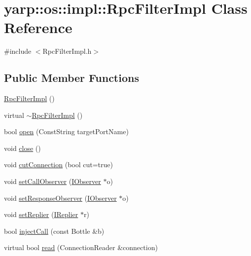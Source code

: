 \hypertarget{classyarp_1_1os_1_1impl_1_1_rpc_filter_impl}{
\section{yarp::os::impl::RpcFilterImpl Class Reference}
\label{classyarp_1_1os_1_1impl_1_1_rpc_filter_impl}
}


{\ttfamily \#include $<$RpcFilterImpl.h$>$}\subsection*{Public Member Functions}
\begin{DoxyCompactItemize}
\item 
\hyperlink{classyarp_1_1os_1_1impl_1_1_rpc_filter_impl_a15ed48bd9dfa1d97e242ea54b7d17977}{RpcFilterImpl} ()
\item 
virtual \hyperlink{classyarp_1_1os_1_1impl_1_1_rpc_filter_impl_af0b70bf356655fd2de7133532798faf0}{$\sim$RpcFilterImpl} ()
\item 
bool \hyperlink{classyarp_1_1os_1_1impl_1_1_rpc_filter_impl_a9ee7fb8756ba19285866308cdf1d60c2}{open} (ConstString targetPortName)
\item 
void \hyperlink{classyarp_1_1os_1_1impl_1_1_rpc_filter_impl_a6617044e3948a5fa890a68a918d93c72}{close} ()
\item 
void \hyperlink{classyarp_1_1os_1_1impl_1_1_rpc_filter_impl_a3c3f3382e223f75955459fc29bbd9e3d}{cutConnection} (bool cut=true)
\item 
void \hyperlink{classyarp_1_1os_1_1impl_1_1_rpc_filter_impl_aeca9c8a9d37355dd222a825bdb121c35}{setCallObserver} (\hyperlink{classyarp_1_1os_1_1_i_observer}{IObserver} $\ast$o)
\item 
void \hyperlink{classyarp_1_1os_1_1impl_1_1_rpc_filter_impl_af31c769d6b5e50170d080aea6aa650c5}{setResponseObserver} (\hyperlink{classyarp_1_1os_1_1_i_observer}{IObserver} $\ast$o)
\item 
void \hyperlink{classyarp_1_1os_1_1impl_1_1_rpc_filter_impl_aa7595e915624ac4c6126919c00761a23}{setReplier} (\hyperlink{classyarp_1_1os_1_1_i_replier}{IReplier} $\ast$r)
\item 
bool \hyperlink{classyarp_1_1os_1_1impl_1_1_rpc_filter_impl_a0f795cf3383a030884a7fde9843de1f7}{injectCall} (const Bottle \&b)
\item 
virtual bool \hyperlink{classyarp_1_1os_1_1impl_1_1_rpc_filter_impl_ab8ff43bc5f1f926aa49185818fdfe3b7}{read} (ConnectionReader \&connection)

\end{DoxyCompactItemize}
